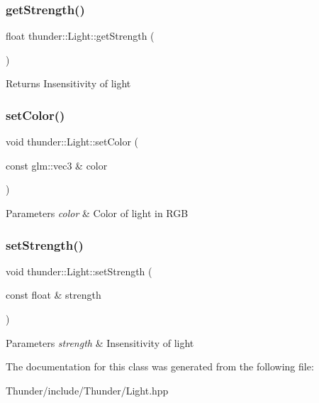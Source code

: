 \subsubsection{\texorpdfstring{get\+Strength()}{getStrength()}}
{\footnotesize\ttfamily float thunder\+::\+Light\+::get\+Strength (\begin{DoxyParamCaption}{ }\end{DoxyParamCaption})}

\begin{DoxyReturn}{Returns}
Insensitivity of light 
\end{DoxyReturn}
\mbox{\label{classthunder_1_1_light_ae18169e11ef13011e6bb2d12e64596f5}} 
\subsubsection{\texorpdfstring{set\+Color()}{setColor()}}
{\footnotesize\ttfamily void thunder\+::\+Light\+::set\+Color (\begin{DoxyParamCaption}\item[{const glm\+::vec3 \&}]{color }\end{DoxyParamCaption})}


\begin{DoxyParams}{Parameters}
{\em color} & Color of light in R\+GB \\
\hline
\end{DoxyParams}
\mbox{\label{classthunder_1_1_light_a27add0c85ed86200826d63a1bea71b0a}} 
\subsubsection{\texorpdfstring{set\+Strength()}{setStrength()}}
{\footnotesize\ttfamily void thunder\+::\+Light\+::set\+Strength (\begin{DoxyParamCaption}\item[{const float \&}]{strength }\end{DoxyParamCaption})}


\begin{DoxyParams}{Parameters}
{\em strength} & Insensitivity of light \\
\hline
\end{DoxyParams}


The documentation for this class was generated from the following file\+:\begin{DoxyCompactItemize}
\item 
Thunder/include/\+Thunder/Light.\+hpp\end{DoxyCompactItemize}
